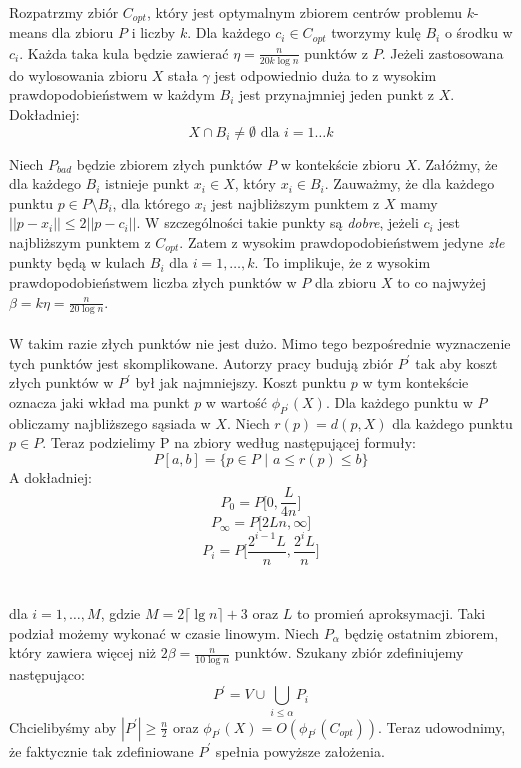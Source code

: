 Rozpatrzmy zbiór $C_{opt}$, który jest optymalnym zbiorem centrów problemu $k$-means dla zbioru $P$ i liczby $k$.
Dla każdego $c_{i} \in C_{opt}$ tworzymy kulę $B_{i}$ o środku w $c_{i}$.
Każda taka kula będzie zawierać $\eta = \frac{n}{20k \log n}$ punktów z $P$.
Jeżeli zastosowana do wylosowania zbioru $X$ stała $\gamma$ jest odpowiednio duża to z wysokim prawdopodobieństwem w każdym $B_{i}$ jest przynajmniej jeden punkt z $X$.
Dokładniej:
\begin{equation}
    X \cap B_{i} \neq \emptyset \text{ dla } i = 1 \dots k
\end{equation}

\noindent
Niech $P_{bad}$ będzie zbiorem złych punktów $P$ w kontekście zbioru $X$.
Załóżmy, że dla każdego $B_{i}$ istnieje punkt $x_{i} \in X$, który $x_{i} \in B_{i}$.
Zauważmy, że dla każdego punktu $p \in P \setminus B_{i}$, dla którego $x_{i}$ jest najbliższym punktem z $X$ mamy $||p - x_{i}|| \leq 2||p - c_{i}||$.
W szczególności takie punkty są \textit{dobre}, jeżeli $c_{i}$ jest najbliższym punktem z $C_{opt}$.
Zatem z wysokim prawdopodobieństwem jedyne \textit{złe} punkty będą w kulach $B_{i}$ dla $ i = 1, \dots, k$.
To implikuje, że z wysokim prawdopodobieństwem liczba złych punktów w $P$ dla zbioru $X$ to co najwyżej $\beta = k\eta = \frac{n}{20 \log n}$.
\\~\\
W takim razie złych punktów nie jest dużo.
Mimo tego bezpośrednie wyznaczenie tych punktów jest skomplikowane.
Autorzy pracy \cite{10.1145/1007352.1007400} budują zbiór $P^{'}$ tak aby koszt złych punktów w $P^{'}$ był jak najmniejszy.
Koszt punktu $p$ w tym kontekście oznacza jaki wkład ma punkt $p$ w wartość $\phi_{P^{'}}(X)$.
Dla każdego punktu w $P$ obliczamy najbliższego sąsiada w $X$.
Niech $r(p) = d(p, X)$ dla każdego punktu $p \in P$.
Teraz podzielimy P na zbiory według następującej formuły:
\begin{equation}
    P[a,b] = \{ p \in P \text{ | } a \leq r(p) \leq b \}
\end{equation}
A dokładniej:
\begin{equation}
    P_{0} = P\Big[0, \frac{L}{4n}\Big]
\end{equation}
\begin{equation}
    P_{ \infty } = P\Big[2Ln, \infty \Big]
\end{equation}
\begin{equation}
    P_{i} = P\Big[ \frac{2^{i-1}L}{n}, \frac{2^{i}L}{n} \Big]
\end{equation}
\\~\\
dla $i = 1, \dots, M$, gdzie $M = 2 \lceil \lg n \rceil + 3$ oraz $L$ to promień aproksymacji.
Taki podział możemy wykonać w czasie linowym.
Niech $P_{\alpha}$ będzię ostatnim zbiorem, który zawiera więcej niż $2\beta = \frac{n}{10 \log n}$ punktów. 
Szukany zbiór zdefiniujemy następująco:
\begin{equation}
    P^{'} = V \cup \bigcup_{i \leq \alpha} P_{i}
\end{equation}
Chcielibyśmy aby $|P^{'}| \geq \frac{n}{2}$ oraz $\phi_{P^{'}}(X) = O(\phi_{P^{'}}(C_{opt}))$.
Teraz udowodnimy, że faktycznie tak zdefiniowane $P^{'}$ spełnia powyższe założenia.

